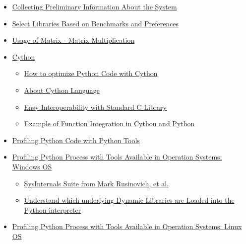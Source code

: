 \documentclass[
]{article}
\begin{document}
\begin{itemize}
  \begin{itemize}
  \item
    \protect\hyperlink{collecting-preliminary-information-about-the-system}{Collecting
    Preliminary Information About the System}
  \item
    \protect\hyperlink{select-libraries-based-on-benchmarks-and-preferences}{Select
    Libraries Based on Benchmarks and Preferences}
  \item
    \protect\hyperlink{usage-of-matrix-matrix-multiplication}{Usage of
    Matrix - Matrix Multiplication}
  \item
    \protect\hyperlink{cython}{Cython}

    \begin{itemize}
    \item
      \protect\hyperlink{how-to-optimize-python-code-with-cython}{How to
      optimize Python Code with Cython}
    \item
      \protect\hyperlink{about-cython-language}{About Cython Language}
    \item
      \protect\hyperlink{easy-interoperability-with-standard-c-library}{Easy
      Interoperability with Standard C Library}
    \item
      \protect\hyperlink{example-of-function-integration-in-cython-and-python}{Example
      of Function Integration in Cython and Python}
    \end{itemize}
  \item
    \protect\hyperlink{profiling-python-code-with-python-tools}{Profiling
    Python Code with Python Tools}
  \item
    \protect\hyperlink{profiling-python-process-with-tools-available-in-operation-systems-windows-os}{Profiling
    Python Process with Tools Available in Operation Systems: Windows
    OS}

    \begin{itemize}
    \item
      \protect\hyperlink{sysinternals-suite-from-mark-rusinovich-et-al}{SysInternals
      Suite from Mark Rusinovich, et al.}
    \item
      \protect\hyperlink{understand-which-underlying-dynamic-libraries-are-loaded-into-the-python-interpreter}{Understand
      which underlying Dynamic Libraries are Loaded into the Python
      interpreter}
    \end{itemize}
  \item
    \protect\hyperlink{profiling-python-process-with-tools-available-in-operation-systems-linux-os}{Profiling
    Python Process with Tools Available in Operation Systems: Linux OS}


\end{itemize}
\end{itemize}
\end{document}
